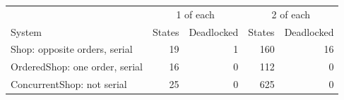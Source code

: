 \begin{tabular}{@{}lrrrr@{}}
\toprule
 & \multicolumn{2}{c}{1 of each} & \multicolumn{2}{c}{2 of each} \\
System & States & Deadlocked & States & Deadlocked \\
\midrule
Shop: opposite orders, serial & 19 & 1 & 160 & 16 \\
OrderedShop: one order, serial & 16 & 0 & 112 & 0 \\
ConcurrentShop: not serial & 25 & 0 & 625 & 0 \\
\bottomrule
\end{tabular}
